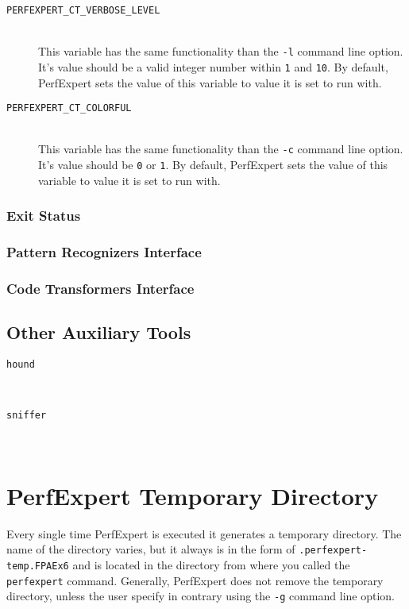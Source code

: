 \begin{description}
	\item[\texttt{PERFEXPERT\_CT\_VERBOSE\_LEVEL}]\hfill \\
	This variable has the same functionality than the \texttt{-l} command line option. It's value should be a valid integer number within \texttt{1} and \texttt{10}. By default, PerfExpert sets the value of this variable to value it is set to run with.

	\item[\texttt{PERFEXPERT\_CT\_COLORFUL}]\hfill \\
	This variable has the same functionality than the \texttt{-c} command line option. It's value should be \texttt{0} or \texttt{1}. By default, PerfExpert sets the value of this variable to value it is set to run with.
\end{description}

\subsubsection{Exit Status}

\subsubsection{Pattern Recognizers Interface}

\subsubsection{Code Transformers Interface}

\subsection{Other Auxiliary Tools}

\begin{description}
	\item[\texttt{hound}]\hfill \\
	
	\item[\texttt{sniffer}]\hfill \\
\end{description}

\section{PerfExpert Temporary Directory}

Every single time PerfExpert is executed it generates a temporary directory. The name of the directory varies, but it always is in the form of \texttt{.perfexpert-temp.FPAEx6} and is located in the directory from where you called the \texttt{perfexpert} command. Generally, PerfExpert does not remove the temporary directory, unless the user specify in contrary using the \texttt{-g} command line option.

